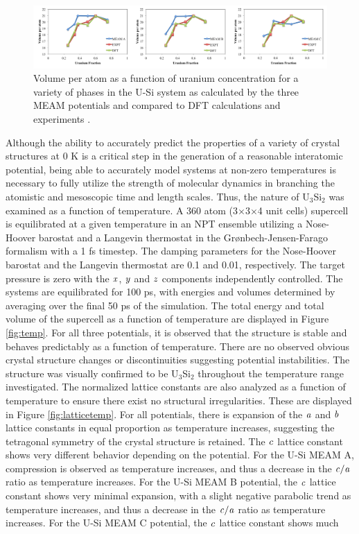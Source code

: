 \documentclass[review]{elsarticle}
\begin{document}
 \begin{figure}[hbt]
	\centering
	\includegraphics[width=\textwidth]{vol3.png}
    \caption{Volume per atom as a function of uranium concentration for a variety of phases in the U-Si system as calculated by the three MEAM potentials and compared to DFT calculations \cite{noordhoek2016} and experiments \cite{berche2009}.}\label{fig:vol3}
\end{figure}

\FloatBarrier

Although the ability to accurately predict the properties of a variety of crystal structures at 0 K is a critical step in the generation of a reasonable interatomic potential, being able to accurately model systems at non-zero temperatures is necessary to fully utilize the strength of molecular dynamics in branching the atomistic and mesoscopic time and length scales.  Thus, the nature of U$_{3}$Si$_{2}$ was examined as a function of temperature.  A 360 atom (3$\times$3$\times$4 unit cells) supercell is equilibrated at a given temperature in an NPT ensemble utilizing a Nose-Hoover barostat and a Langevin thermostat in the Gr{\o}nbech-Jensen-Farago \cite{gjf2013} formalism with a 1 fs timestep.  The damping parameters for the Nose-Hoover barostat and the Langevin thermostat are 0.1 and 0.01, respectively.  The target pressure is zero with the $\it{x}$, $\it{y}$ and $\it{z}$ components independently controlled. The systems are equilibrated for 100 ps, with energies and volumes determined by averaging over the final 50 ps of the simulation.  The total energy and total volume of the supercell as a function of temperature are displayed in Figure \ref{fig:temp}.  For all three potentials, it is observed that the structure is stable and behaves predictably as a function of temperature.   There are no observed obvious crystal structure changes or discontinuities suggesting potential instabilities.  The structure was visually confirmed to be U$_{3}$Si$_{2}$ throughout the temperature range investigated.  The normalized lattice constants are also analyzed as a function of temperature to ensure there exist no structural irregularities.  These are displayed in Figure \ref{fig:latticetemp}.  For all potentials, there is expansion of the $\it{a}$ and $\it{b}$ lattice constants in equal proportion as temperature increases, suggesting the tetragonal symmetry of the crystal structure is retained.  The $\it{c}$ lattice constant shows very different behavior depending on the potential.  For the U-Si MEAM A, compression is observed as temperature increases, and thus a decrease in the $\it{c/a}$ ratio as temperature increases.  For the U-Si MEAM B potential, the $\it{c}$ lattice constant shows very minimal expansion, with a slight negative parabolic trend as temperature increases, and thus a decrease in the $\it{c/a}$ ratio as temperature increases.  For the U-Si MEAM C potential, the $\it{c}$ lattice constant shows much 
\end{document}
